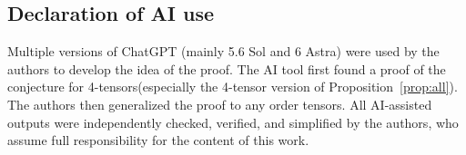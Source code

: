 \documentclass[11pt,reqno]{amsart}
\theoremstyle{plain}
\theoremstyle{definition}
\begin{document}
\subsection*{Declaration of AI use}
Multiple versions of ChatGPT (mainly 5.6 Sol and 6 Astra) were used by the authors to develop the idea of the proof. The AI tool first found a proof of the conjecture for 4-tensors(especially the 4-tensor version of Proposition~\ref{prop:all}). The authors then generalized the proof to any order tensors. All AI-assisted outputs were independently checked, verified, and simplified by the authors, who assume full responsibility for the content of this work.


\end{document}
